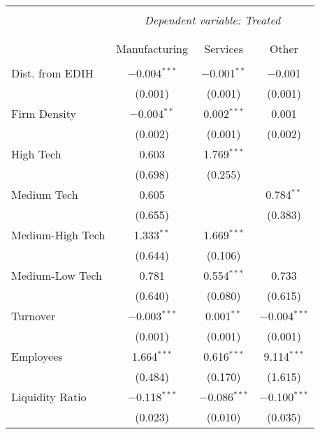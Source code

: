 
\begin{table}[!htbp] \centering 
  \tiny
  \renewcommand{\arraystretch}{1} 
    \label{} 
\begin{tabular}{@{\extracolsep{5pt}}lccc} 
\\[-1.8ex]\hline 
\hline \\[-1.8ex] 
 & \multicolumn{3}{c}{\textit{Dependent variable: Treated}} \\ 
\cline{2-4} 
\\[-1.8ex] & \multicolumn{3}{c}{} \\ 
 & Manufacturing & Services & Other \\ 
\hline \\[-1.8ex] 
 Dist. from EDIH & $-$0.004$^{***}$ & $-$0.001$^{**}$ & $-$0.001 \\ 
  & (0.001) & (0.001) & (0.001) \\ 

 Firm Density & $-$0.004$^{**}$ & 0.002$^{***}$ & 0.001 \\ 
  & (0.002) & (0.001) & (0.002) \\ 

 High Tech & 0.603 & 1.769$^{***}$ &  \\ 
  & (0.698) & (0.255) &  \\ 
 
 Medium Tech & 0.605 &  & 0.784$^{**}$ \\ 
  & (0.655) &  & (0.383) \\ 

 Medium-High Tech & 1.333$^{**}$ & 1.669$^{***}$ &  \\ 
  & (0.644) & (0.106) &  \\ 
 
 Medium-Low Tech & 0.781 & 0.554$^{***}$ & 0.733 \\ 
  & (0.640) & (0.080) & (0.615) \\ 

 Turnover & $-$0.003$^{***}$ & 0.001$^{**}$ & $-$0.004$^{***}$ \\ 
  & (0.001) & (0.001) & (0.001) \\ 

 Employees & 1.664$^{***}$ & 0.616$^{***}$ & 9.114$^{***}$ \\ 
  & (0.484) & (0.170) & (1.615) \\ 

 Liquidity Ratio & $-$0.118$^{***}$ & $-$0.086$^{***}$ & $-$0.100$^{***}$ \\ 
  & (0.023) & (0.010) & (0.035) \\ 


\end{tabular}
\end{table}
